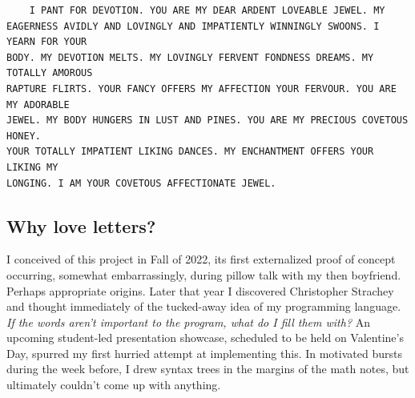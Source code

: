 \documentclass[runningheads]{llncs}
\begin{document}
\begin{verbatim}
    I PANT FOR DEVOTION. YOU ARE MY DEAR ARDENT LOVEABLE JEWEL. MY
EAGERNESS AVIDLY AND LOVINGLY AND IMPATIENTLY WINNINGLY SWOONS. I YEARN FOR YOUR
BODY. MY DEVOTION MELTS. MY LOVINGLY FERVENT FONDNESS DREAMS. MY TOTALLY AMOROUS
RAPTURE FLIRTS. YOUR FANCY OFFERS MY AFFECTION YOUR FERVOUR. YOU ARE MY ADORABLE
JEWEL. MY BODY HUNGERS IN LUST AND PINES. YOU ARE MY PRECIOUS COVETOUS HONEY.
YOUR TOTALLY IMPATIENT LIKING DANCES. MY ENCHANTMENT OFFERS YOUR LIKING MY
LONGING. I AM YOUR COVETOUS AFFECTIONATE JEWEL.
\end{verbatim}
\subsection{Why love letters?}
I conceived of this project in Fall of 2022, its first externalized proof of concept occurring, somewhat embarrassingly, during pillow talk with my then boyfriend. %
Perhaps appropriate origins. Later that year I discovered Christopher Strachey and thought immediately of the tucked-away idea of my programming language. \textit{If the words aren't important to the program, what do I fill them with?} An upcoming student-led presentation showcase, scheduled to be held on Valentine's Day, spurred my first hurried attempt at implementing this. In motivated bursts during the week before, I drew syntax trees in the margins of the math notes, but ultimately couldn't come up with anything.
\end{document}
